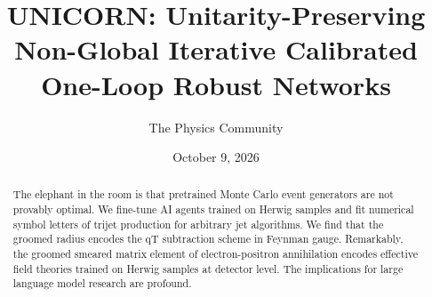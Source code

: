 \documentclass[11pt]{article}
\title{UNICORN: Unitarity-Preserving Non-Global Iterative Calibrated One-Loop Robust Networks}
\author{The Physics Community}
\date{October 9, 2026}
\numberwithin{equation}{section}
\theoremstyle{definition}
\theoremstyle{remark}
\begin{document}
\maketitle
\begin{abstract}
The elephant in the room is that pretrained Monte Carlo event generators
are not provably optimal. We fine-tune AI agents trained on Herwig
samples and fit numerical symbol letters of trijet production for
arbitrary jet algorithms. We find that the groomed radius encodes the qT
subtraction scheme in Feynman gauge. Remarkably, the groomed smeared
matrix element of electron-positron annihilation encodes effective field
theories trained on Herwig samples at detector level. The implications
for large language model research are profound.
\end{abstract}
\tableofcontents



\nocite{*}


\end{document}
